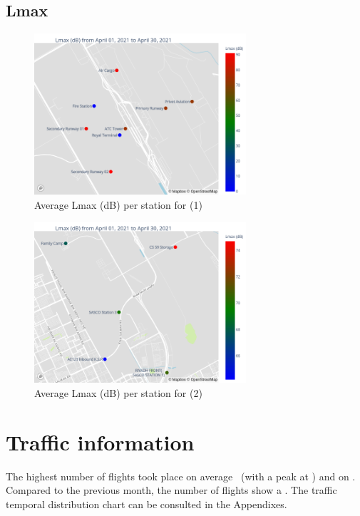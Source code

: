 \documentclass[12pt, oneside]{book}
\begin{document}
\section{Lmax}

{\begin{figure}[H]
\centering
\qquad\includegraphics[width=0.7\textwidth, keepaspectratio]{image3}
\caption{Average Lmax (dB) per station for \monthyear (1)}\label{image3}
\end{figure}}{}

{\begin{figure}[H]
\centering
\qquad\includegraphics[width=0.7\textwidth, keepaspectratio]{image6}
\caption{Average Lmax (dB) per station for \monthyear (2)}\label{image6}
\end{figure}}{}



\chapter{Traffic information}

The highest number of flights took place on average  \trafficPeriod \ (with a peak at \trafficHour) and on \trafficDay . Compared to the previous month, the number of flights show a \trafficChange. The traffic temporal distribution chart can be consulted in the Appendixes.
\end{document}
